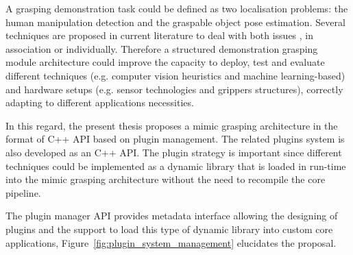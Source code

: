 A grasping demonstration task could be defined as two localisation problems: the human manipulation detection and the graspable object pose estimation. Several techniques are proposed in current literature to deal with both issues , in association or individually. Therefore a structured demonstration grasping module architecture could improve the capacity to deploy, test and evaluate different techniques (e.g. computer vision heuristics and machine learning-based) and hardware setups (e.g. sensor technologies and grippers structures), correctly adapting to different applications necessities.

In this regard, the present thesis proposes a mimic grasping architecture in the format of C++ API based on plugin management. The related plugins system is also developed as an C++ API. The plugin strategy is important since different techniques could be implemented as a dynamic library that is loaded in run-time into the mimic grasping architecture without the need to recompile the core pipeline. 

The plugin manager API provides metadata interface allowing the designing of plugins and the support to load this type of dynamic library into custom core applications, Figure~\ref{fig:plugin_system_management} elucidates the proposal.


